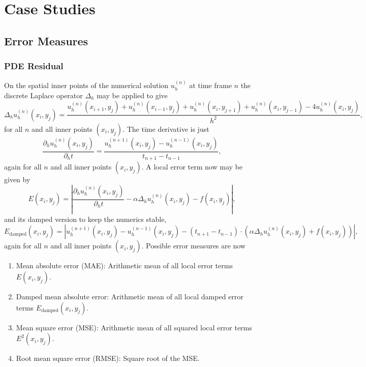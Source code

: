 \documentclass[a4paper,11pt]{article}
\theoremstyle{plain} %
\theoremstyle{definition} %
\theoremstyle{remark} %
\theoremstyle{remark}
\def\Laplace{\Delta}
\begin{document}
\section{Case Studies}

\subsection{Error Measures}
\subsubsection*{PDE Residual}
On the spatial inner points of the numerical solution $ u_h^{(n)} $ at time frame $n$ the discrete Laplace operator $\Laplace_h $ may be applied to give
\begin{equation*}
\Laplace_h u_h^{(n)} (x_i,y_j)  = \frac{u_h^{(n)} (x_{i+1},y_j) + u_h^{(n)} (x_{i-1},y_j) + u_h^{(n)} (x_i,y_{j+1}) +u_h^{(n)} (x_i,y_{j-1}) - 4 u_h^{(n)} (x_i,y_j) }{h^2},
\end{equation*}
for all $n$ and all inner points $(x_i,y_j) $.
The time derivative is just 
\begin{equation*}
\frac{\partial_h u_h^{(n)} (x_i,y_j) }{\partial_h t} = \frac{u_h^{(n + 1)} (x_i,y_j) - u_h^{(n-1)} (x_i,y_j) }{t_{n+1} - t_{n-1}},
\end{equation*}
again for all $n$ and all inner points $(x_i,y_j) $. A local error term now may be given by
\begin{equation*}
E (x_i,y_j) = \left| \frac{\partial_h u_h^{(n)} (x_i,y_j) }{\partial_h t} - \alpha \Laplace_h u_h^{(n)} (x_i,y_j) - f (x_i,y_j) \right|,
\end{equation*}
and its damped version to keep the numerics stable, 
\begin{equation*}
E_{\mathrm{damped}} (x_i,y_j) = \left| u_h^{(n + 1)} (x_i,y_j) - u_h^{(n-1)} (x_i,y_j) - (t_{n+1} - t_{n-1})\cdot\left( \alpha \Laplace_h u_h^{(n)} (x_i,y_j) + f (x_i,y_j)\right) \right|,
\end{equation*}
again for all $n$ and all inner points $(x_i,y_j) $. Possible error measures are now
\begin{enumerate}
\item
Mean absolute error (MAE): Arithmetic mean of all local error terms $E (x_i,y_j) $.
\item 
Damped mean absolute error: Arithmetic mean of all local damped error terms $E_{\mathrm{damped}} (x_i,y_j) $.
\item
Mean square error (MSE): Arithmetic mean of all squared local error terms $E^2 (x_i,y_j) $.
\item
Root mean square error (RMSE): Square root of the MSE.
\end{enumerate}
\end{document}
